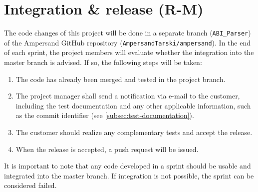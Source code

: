 
\section{Integration \& release (R-M)}
\label{sec:integration-release}
%
%
The code changes of this project will be done in a separate branch (\texttt{ABI\_Parser}) of the Ampersand GitHub repository (\texttt{AmpersandTarski/ampersand}).
In the end of each sprint, the project members will evaluate whether the integration into the master branch is advised.
If so, the following steps will be taken:
\begin{enumerate}
	\item The code has already been merged and tested in the project branch.
	\item The project manager shall send a notification via e-mail to the customer, including the test documentation and any other applicable information, such as the commit identifier (see \autoref{subsec:test-documentation}).
	\item The customer should realize any complementary tests and accept the release.
	\item When the release is accepted, a push request will be issued.
\end{enumerate}
%
It is important to note that any code developed in a sprint should be usable and integrated into the master branch.
If integration is not possible, the sprint can be considered failed.